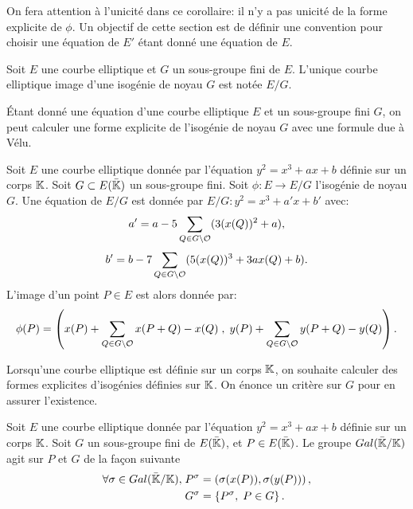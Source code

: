 \begin{Rem}
	On fera attention à l'unicité dans ce corollaire: il n'y a pas unicité de la forme explicite de $\phi$. Un objectif de cette section est de définir une convention pour choisir une équation de $E'$ étant donné une équation de $E$. 
\end{Rem} 

\begin{Def}
	Soit $E$ une courbe elliptique et $G$ un sous-groupe fini de $E$. L'unique courbe elliptique image d'une isogénie de noyau $G$ est notée $E/G$.
\end{Def}

Étant donné une équation d'une courbe elliptique $E$ et un sous-groupe fini $G$, on peut calculer une forme explicite de l'isogénie de noyau $G$ avec une formule due à Vélu. 

\begin{Prop}\label{FormuleVélu}
	
	Soit $E$ une courbe elliptique donnée par l'équation $y^2 = x^3 + ax + b$ définie sur un corps $\mathbb{K}$. Soit $G\subset E(\bar{\mathbb{K}})$ un sous-groupe fini. Soit $\phi : E\rightarrow E/G$ l'isogénie de noyau $G$. Une équation de $E/G$ est donnée par $E/G : y^2 = x^3 + a'x + b'$ avec:
	\begin{equation*}
		a' = a - 5\sum_{Q\in G\setminus{\mathcal{O}}}(3 (x(Q))^2 + a ),
	\end{equation*}
	\begin{equation*}
		b' = b - 7\sum_{Q\in G\setminus{\mathcal{O}}}(5 (x(Q))^3 + 3ax(Q) + b ).
	\end{equation*}
	L'image d'un point $P\in E$ est alors donnée par:
	\begin{equation*}
		\phi(P) = \left( x(P) + \sum_{Q\in G\setminus{\mathcal{O}}} x(P+Q) - x(Q)\;,\;y(P) + \sum_{Q\in G\setminus{\mathcal{O}}} y(P+Q) - y(Q)\right).
	\end{equation*} 
\end{Prop}

Lorsqu'une courbe elliptique est définie sur un corps $\mathbb{K}$, on souhaite calculer des formes explicites d'isogénies définies sur $\mathbb{K}$. On énonce un critère sur $G$ pour en assurer l'existence.

\begin{Def}
	Soit $E$ une courbe elliptique donnée par l'équation $y^2 = x^3 + ax + b$ définie sur un corps $\mathbb{K}$. Soit $G$ un sous-groupe fini de $E(\bar{\mathbb{K}})$, et $P\in E(\bar{\mathbb{K}})$. Le groupe $Gal(\bar{\mathbb{K}}/\mathbb{K})$ agit sur $P$ et $G$ de la façon suivante
	\begin{align*}
		\forall\sigma\in Gal(\bar{\mathbb{K}}/\mathbb{K}),\;& P^{\sigma} = \left( \sigma(x(P)), \sigma(y(P))\right),\\
		& G^{\sigma} = \left\lbrace P^{\sigma},\; P\in G \right\rbrace.
	\end{align*}
\end{Def}

